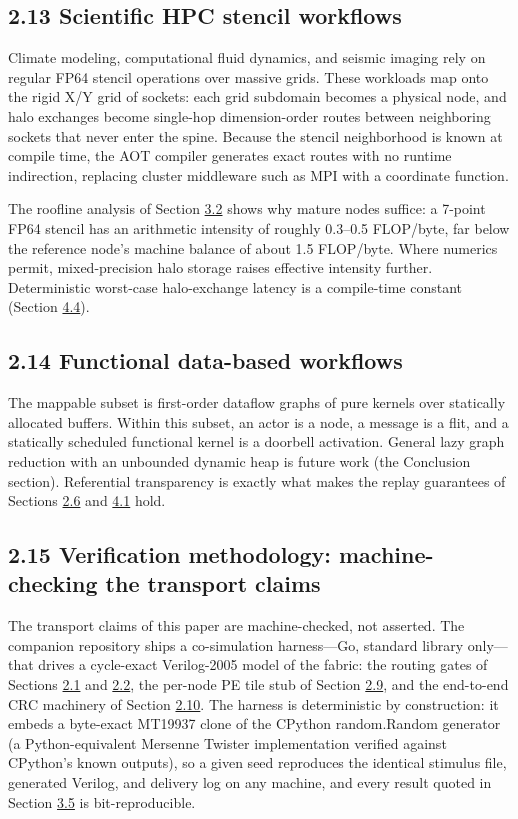 \documentclass[12pt,onecolumn]{article}
\begin{document}
\subsection*{2.13 Scientific HPC stencil workflows}\label{sec:2.13}

Climate modeling, computational fluid dynamics, and seismic imaging rely on regular FP64 stencil operations over massive grids. These workloads map onto the rigid X/Y grid of sockets: each grid subdomain becomes a physical node, and halo exchanges become single-hop dimension-order routes between neighboring sockets that never enter the spine. Because the stencil neighborhood is known at compile time, the AOT compiler generates exact routes with no runtime indirection, replacing cluster middleware such as MPI\cite{19} with a coordinate function.

The roofline analysis of Section \hyperref[sec:3.2]{3.2} shows why mature nodes suffice: a 7-point FP64 stencil has an arithmetic intensity of roughly 0.3--0.5 FLOP/byte, far below the reference node's machine balance of about 1.5 FLOP/byte\cite{5}. Where numerics permit, mixed-precision halo storage raises effective intensity further. Deterministic worst-case halo-exchange latency is a compile-time constant (Section \hyperref[sec:4.4]{4.4}).

\subsection*{2.14 Functional data-based workflows}\label{sec:2.14}

The mappable subset is first-order dataflow graphs of pure kernels over statically allocated buffers\cite{6,11}. Within this subset, an actor is a node, a message is a flit, and a statically scheduled functional kernel is a doorbell activation. General lazy graph reduction with an unbounded dynamic heap is future work (the Conclusion section). Referential transparency is exactly what makes the replay guarantees of Sections \hyperref[sec:2.6]{2.6} and \hyperref[sec:4.1]{4.1} hold.

\subsection*{2.15 Verification methodology: machine-checking the transport claims}\label{sec:2.15}

The transport claims of this paper are machine-checked, not asserted. The companion repository ships a co-simulation harness---Go, standard library only---that drives a cycle-exact Verilog-2005 model of the fabric: the routing gates of Sections \hyperref[sec:2.1]{2.1} and \hyperref[sec:2.2]{2.2}, the per-node PE tile stub of Section \hyperref[sec:2.9]{2.9}, and the end-to-end CRC machinery of Section \hyperref[sec:2.10]{2.10}\cite{28}. The harness is deterministic by construction: it embeds a byte-exact MT19937 clone of the CPython random.Random generator (a Python-equivalent Mersenne Twister implementation verified against CPython's known outputs), so a given seed reproduces the identical stimulus file, generated Verilog, and delivery log on any machine, and every result quoted in Section \hyperref[sec:3.5]{3.5} is bit-reproducible.
\end{document}
